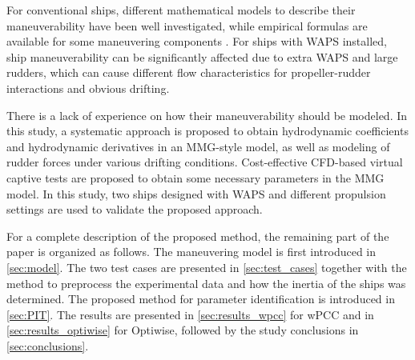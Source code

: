 For conventional ships, different mathematical models to describe their maneuverability have been well investigated, while empirical formulas are available for some maneuvering components \citep{yasukawaIntroductionMMGStandard2015}. For ships with WAPS installed, ship maneuverability can be significantly affected due to extra WAPS and large rudders, which can cause different flow characteristics for propeller-rudder interactions and obvious drifting. 



There is a lack of experience on how their maneuverability should be modeled. In this study, a systematic approach is proposed to obtain hydrodynamic coefficients and hydrodynamic derivatives in an MMG-style model, as well as modeling of rudder forces under various drifting conditions. Cost-effective CFD-based virtual captive tests are proposed to obtain some necessary parameters in the MMG model. In this study, two ships designed with WAPS and different propulsion settings are used to validate the proposed approach.

For a complete description of the proposed method, the remaining part of the paper is organized as follows. The maneuvering model is first introduced in \autoref{sec:model}. The two test cases are presented in \autoref{sec:test_cases} together with the method to preprocess the experimental data and how the inertia of the ships was determined. The proposed method for parameter identification is introduced in \autoref{sec:PIT}. The results are presented in \autoref{sec:results_wpcc} for wPCC and in \autoref{sec:results_optiwise} for Optiwise, followed by the study conclusions in \autoref{sec:conclusions}.




